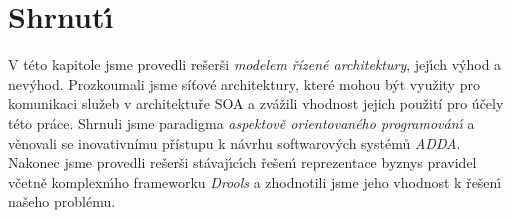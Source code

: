 \section{Shrnut\'{\i}}

V této kapitole jsme provedli rešerši \textit{modelem řízené architektury},
jej\'{\i}ch v\'yhod a nev\'yhod. Prozkoumali jsme síťové architektury,
které mohou být využity pro komunikaci služeb v architektuře \gls{SOA}
a zvážili vhodnost jejich použití pro účely této práce.
Shrnuli jsme paradigma \textit{aspektově orientovaného programován\'{\i}} a
věnovali se inovativnímu přístupu k návrhu softwarov\'ych systémů \textit{ADDA}.
Nakonec jsme provedli rešerši stávaj\'{\i}c\'{\i}ch řešen\'{\i} reprezentace byznys pravidel
včetně komplexn\'{\i}ho frameworku \textit{Drools} a zhodnotili jsme jeho vhodnost
k řešen\'{\i} našeho problému.
